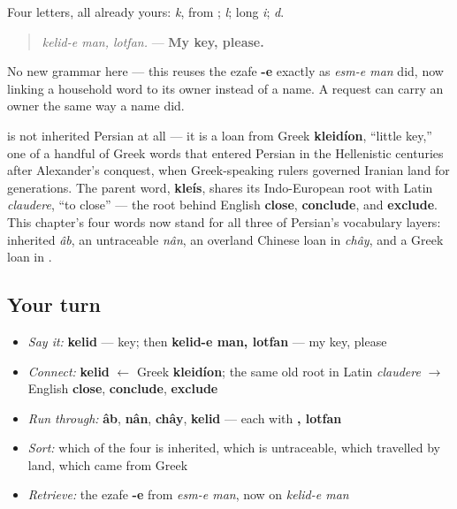 Four letters, all already yours: \textbf{} \emph{k}, from \textbf{}; \textbf{} \emph{l}; \textbf{} long \emph{i}; \textbf{} \emph{d}.

\begin{grammarlens}[title={Grammar Lens: a possessive request, built from an old part}]
\begin{quote}
\emph{kelid-e man, lotfan.} — \textbf{My key, please.}
\end{quote}

No new grammar here — this reuses the ezafe \textbf{-e} exactly as \emph{esm-e man} did, now linking a household word to its owner instead of a name. A request can carry an owner the same way a name did.
\end{grammarlens}

\begin{cousinweb}
\textbf{} is not inherited Persian at all — it is a loan from Greek \textbf{kleidíon}, “little key,” one of a handful of Greek words that entered Persian in the Hellenistic centuries after Alexander's conquest, when Greek-speaking rulers governed Iranian land for generations. The parent word, \textbf{kleís}, shares its Indo-European root with Latin \emph{claudere}, “to close” — the root behind English \textbf{close}, \textbf{conclude}, and \textbf{exclude}. This chapter's four words now stand for all three of Persian's vocabulary layers: inherited \emph{âb}, an untraceable \emph{nân}, an overland Chinese loan in \emph{chây}, and a Greek loan in \textbf{}.
\end{cousinweb}

\subsection*{Your turn}
\begin{itemize}
\raggedright
  \item \emph{Say it:} \textbf{kelid} — key; then \textbf{kelid-e man, lotfan} — my key, please
  \item \emph{Connect:} \textbf{kelid} $\leftarrow$ Greek \textbf{kleidíon}; the same old root in Latin \emph{claudere} $\to$ English \textbf{close}, \textbf{conclude}, \textbf{exclude}
  \item \emph{Run through:} \textbf{âb}, \textbf{nân}, \textbf{chây}, \textbf{kelid} — each with \textbf{, lotfan}
  \item \emph{Sort:} which of the four is inherited, which is untraceable, which travelled by land, which came from Greek
  \item \emph{Retrieve:} the ezafe \textbf{-e} from \emph{esm-e man}, now on \emph{kelid-e man}
\end{itemize}

